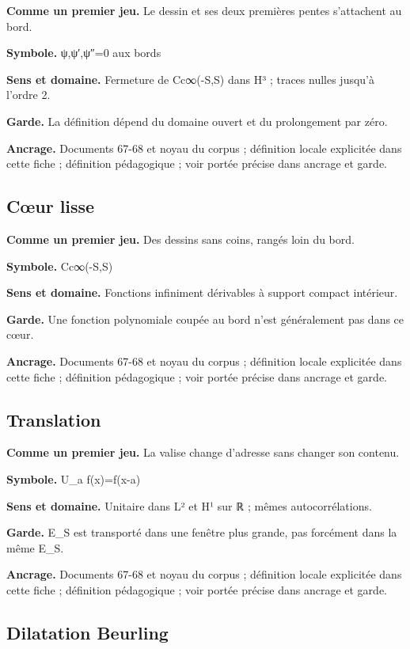 \documentclass[
  9pt,
  a4paper,
]{article}
\begin{document}
\textbf{Comme un premier jeu.} Le dessin et ses deux premières pentes
s'attachent au bord.

\textbf{Symbole.} ψ,ψ′,ψ″=0 aux bords

\textbf{Sens et domaine.} Fermeture de Cc∞(-S,S) dans H³ ; traces nulles
jusqu'à l'ordre 2.

\textbf{Garde.} La définition dépend du domaine ouvert et du
prolongement par zéro.

\textbf{Ancrage.} Documents 67-68 et noyau du corpus ; définition locale
explicitée dans cette fiche ; définition pédagogique ; voir portée
précise dans ancrage et garde.

\hypertarget{cux153ur-lisse}{%
\subsection{Cœur lisse}\label{cux153ur-lisse}}

\textbf{Comme un premier jeu.} Des dessins sans coins, rangés loin du
bord.

\textbf{Symbole.} Cc∞(-S,S)

\textbf{Sens et domaine.} Fonctions infiniment dérivables à support
compact intérieur.

\textbf{Garde.} Une fonction polynomiale coupée au bord n'est
généralement pas dans ce cœur.

\textbf{Ancrage.} Documents 67-68 et noyau du corpus ; définition locale
explicitée dans cette fiche ; définition pédagogique ; voir portée
précise dans ancrage et garde.

\hypertarget{translation}{%
\subsection{Translation}\label{translation}}

\textbf{Comme un premier jeu.} La valise change d'adresse sans changer
son contenu.

\textbf{Symbole.} U\_a f(x)=f(x-a)

\textbf{Sens et domaine.} Unitaire dans L² et H¹ sur ℝ ; mêmes
autocorrélations.

\textbf{Garde.} E\_S est transporté dans une fenêtre plus grande, pas
forcément dans la même E\_S.

\textbf{Ancrage.} Documents 67-68 et noyau du corpus ; définition locale
explicitée dans cette fiche ; définition pédagogique ; voir portée
précise dans ancrage et garde.

\hypertarget{dilatation-beurling}{%
\subsection{Dilatation Beurling}\label{dilatation-beurling}}
\end{document}
